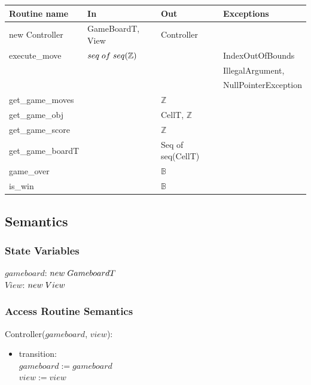 \documentclass[12pt]{article}
\begin{document}
\begin{tabular}{| l | l | l | p{5cm} |}
\hline
\textbf{Routine name} & \textbf{In} & \textbf{Out} & \textbf{Exceptions}\\
\hline
new Controller & GameBoardT, View & Controller & \\
\hline
execute\_move & $seq \thickspace of\thickspace seq(\mathbb{Z})$ & & IndexOutOfBounds\\ & & & IllegalArgument,\\ & & & NullPointerException\\
\hline
get\_game\_moves & & $\mathbb{Z}$ &\\
\hline
get\_game\_obj & & CellT, $\mathbb{Z}$ &\\
\hline
get\_game\_score & & $\mathbb{Z}$ &\\
\hline
get\_game\_boardT & & Seq of seq(CellT) &\\
\hline
game\_over & & $\mathbb{B}$ &\\
\hline
is\_win & & $\mathbb{B}$ &\\
\hline
\end{tabular}

\subsection* {Semantics}

\subsubsection* {State Variables}

$gameboard$: $new \thickspace GameboardT$\\
$View$: $new \thickspace View$\\

\subsubsection* {Access Routine Semantics}

Controller($gameboard$, $view$):
\begin{itemize}
\item transition: \\$gameboard := gameboard$\\
				  $view := view$\\

\end{itemize}
\end{document}
